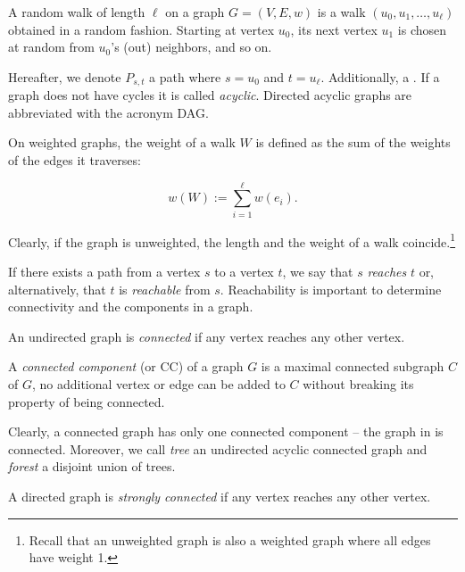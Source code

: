 \begin{definition}
\label{def:random-walk}
A random walk of length $\ell$ on a graph $G = (V, E, w)$ is a walk $(u_0,
u_1, \ldots, u_\ell)$ obtained in a random fashion. Starting at vertex $u_0$,
its next vertex $u_1$ is chosen at random from $u_0$'s (out) neighbors, and so
on.
\end{definition}

Hereafter, we denote $P_{s,t}$ a path where $s = u_0$ and $t = u_\ell$.
Additionally, a .
If a graph does not have cycles it is called \emph{acyclic}. Directed
acyclic graphs are abbreviated with the acronym DAG.

On weighted graphs, the weight of a walk $W$ is defined as the sum of the
weights of the edges it traverses:

\[
w(W) := \sum_{i = 1}^\ell w(e_i).
\]

Clearly, if the graph is unweighted, the length and the weight of a walk
coincide.\footnote{Recall that an unweighted graph is also a weighted graph where
all edges have weight 1.}

If there exists a path from a vertex $s$ to a vertex $t$, we say that $s$
\emph{reaches} $t$ or, alternatively, that $t$ is \emph{reachable} from $s$.
Reachability is important to determine connectivity and the components in a
graph.

\begin{definition}
An undirected graph is \emph{connected} if any vertex reaches any other vertex.
\end{definition}

\begin{definition}
A \emph{connected component} (or CC) of a graph $G$ is a maximal connected subgraph
$C$ of $G$, \ie no additional vertex or edge can be added to $C$ without
breaking its property of being connected.
\end{definition}

Clearly, a connected graph has only one connected component -- \eg the graph in
 is connected.
Moreover, we call \emph{tree} an undirected acyclic connected graph and \emph{forest}
a disjoint union of trees.

\begin{definition}
A directed graph is \emph{strongly connected} if any vertex reaches any other
vertex.
\end{definition}


